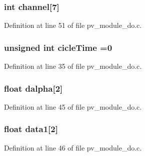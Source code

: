 \subsubsection[{\texorpdfstring{channel}{channel}}]{\setlength{\rightskip}{0pt plus 5cm}int channel\mbox{[}7\mbox{]}}\hypertarget{group__app__do_ga7738565d91833be3229136a1beaaf44b}{}\label{group__app__do_ga7738565d91833be3229136a1beaaf44b}


Definition at line 51 of file pv\+\_\+module\+\_\+do.\+c.

\subsubsection[{\texorpdfstring{cicle\+Time}{cicleTime}}]{\setlength{\rightskip}{0pt plus 5cm}unsigned int cicle\+Time =0}\hypertarget{group__app__do_ga5bdb7b29978109a480db66886e58f475}{}\label{group__app__do_ga5bdb7b29978109a480db66886e58f475}


Definition at line 35 of file pv\+\_\+module\+\_\+do.\+c.

\subsubsection[{\texorpdfstring{dalpha}{dalpha}}]{\setlength{\rightskip}{0pt plus 5cm}float dalpha\mbox{[}2\mbox{]}}\hypertarget{group__app__do_gac55455b51b6abc065db2bfa3a99c0783}{}\label{group__app__do_gac55455b51b6abc065db2bfa3a99c0783}


Definition at line 45 of file pv\+\_\+module\+\_\+do.\+c.

\subsubsection[{\texorpdfstring{data1}{data1}}]{\setlength{\rightskip}{0pt plus 5cm}float data1\mbox{[}2\mbox{]}}\hypertarget{group__app__do_ga44b306459efc6e5e3543390e98fa8df7}{}\label{group__app__do_ga44b306459efc6e5e3543390e98fa8df7}


Definition at line 46 of file pv\+\_\+module\+\_\+do.\+c.

